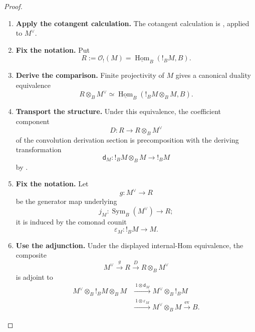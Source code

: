 \begin{proof}
\leavevmode
\begin{enumerate}[label=\textup{(\arabic*)}]
    \item \textbf{Apply the cotangent calculation.}
    The cotangent calculation is , applied to \(M^\vee\).

    \item \textbf{Fix the notation.}
    Put
    \[
            R:=\mathcal O_!(M)
            =
            \underline{\operatorname{Hom}}_B(!_BM,B).
        \]

    \item \textbf{Derive the comparison.}
    Finite projectivity of \(M\) gives a canonical duality equivalence
    \[
            R\otimes_BM^\vee
            \simeq
            \underline{\operatorname{Hom}}_B
            (!_BM\otimes_BM,B).
        \]

    \item \textbf{Transport the structure.}
    Under this equivalence, the coefficient component
    \[
            D:R\longrightarrow R\otimes_BM^\vee
        \]
    of the convolution derivation section is precomposition with the deriving transformation
    \[
            \mathsf d_M:
            !_BM\otimes_BM\longrightarrow !_BM
        \]
    by .

    \item \textbf{Fix the notation.}
    Let
    \[
            g:M^\vee\longrightarrow R
        \]
    be the generator map underlying
    \[
            j_M:
            \operatorname{Sym}_B(M^\vee)\longrightarrow R;
        \]
    it is induced by the comonad counit
    \[
            \varepsilon_M:!_BM\longrightarrow M.
        \]

    \item \textbf{Use the adjunction.}
    Under the displayed internal-Hom equivalence, the composite
    \[
            M^\vee
            \xrightarrow{g}
            R
            \xrightarrow{D}
            R\otimes_BM^\vee
        \]
    is adjoint to
    \[
        \begin{aligned}
            M^\vee\otimes_B!_BM\otimes_BM
            &\xrightarrow{\ 1\otimes\mathsf d_M\ }
            M^\vee\otimes_B!_BM
            \\
            &\xrightarrow{\ 1\otimes\varepsilon_M\ }
            M^\vee\otimes_BM
            \xrightarrow{\ \operatorname{ev}\ }
            B.
        \end{aligned}
        \]


\end{enumerate}
\end{proof}
